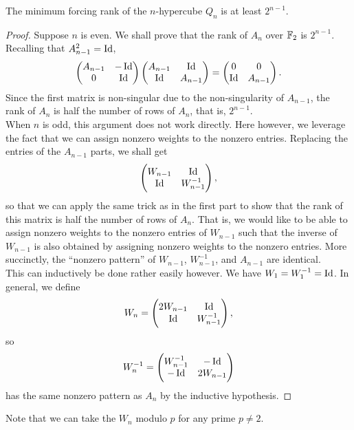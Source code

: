 \begin{flem}
	The minimum forcing rank of the $n$-hypercube $Q_n$ is at least $2^{n-1}$.
\end{flem}
\begin{proof}
	Suppose $n$ is even. We shall prove that the rank of $A_n$ over $\mathbb{F}_2$ is $2^{n-1}$. Recalling that $A_{n-1}^2 = \operatorname{Id}$,
	\[ \begin{pmatrix} A_{n-1} & -\operatorname{Id} \\ 0 & \operatorname{Id} \end{pmatrix} \begin{pmatrix} A_{n-1} & \operatorname{Id} \\ \operatorname{Id} & A_{n-1} \end{pmatrix} = \begin{pmatrix} 0 & 0 \\ \operatorname{Id} & A_{n-1} \end{pmatrix}.  \]
	Since the first matrix is non-singular due to the non-singularity of $A_{n-1}$, the rank of $A_n$ is half the number of rows of $A_n$, that is, $2^{n-1}$.\\

	When $n$ is odd, this argument does not work directly. Here however, we leverage the fact that we can assign nonzero weights to the nonzero entries. Replacing the entries of the $A_{n-1}$ parts, we shall get
	\[ \begin{pmatrix} W_{n-1} & \operatorname{Id} \\ \operatorname{Id} & W_{n-1}^{-1} \end{pmatrix}, \]
	so that we can apply the same trick as in the first part to show that the rank of this matrix is half the number of rows of $A_n$.
	That is, we would like to be able to assign nonzero weights to the nonzero entries of $W_{n-1}$ such that the inverse of $W_{n-1}$ is also obtained by assigning nonzero weights to the nonzero entries. More succinctly, the ``nonzero pattern'' of $W_{n-1}$, $W_{n-1}^{-1}$, and $A_{n-1}$ are identical.\\
	This can inductively be done rather easily however. We have $W_1 = W_1^{-1} = \operatorname{Id}$. In general, we define
	\[ W_n = \begin{pmatrix} 2W_{n-1} & \operatorname{Id} \\ \operatorname{Id} & W_{n-1}^{-1} \end{pmatrix}, \]
	so
	\[ W_n^{-1} = \begin{pmatrix} W_{n-1}^{-1} & -\operatorname{Id} \\ -\operatorname{Id} & 2W_{n-1} \end{pmatrix} \]
	has the same nonzero pattern as $A_n$ by the inductive hypothesis.
\end{proof}
Note that we can take the $W_n$ modulo $p$ for any prime $p \ne 2$.\\

